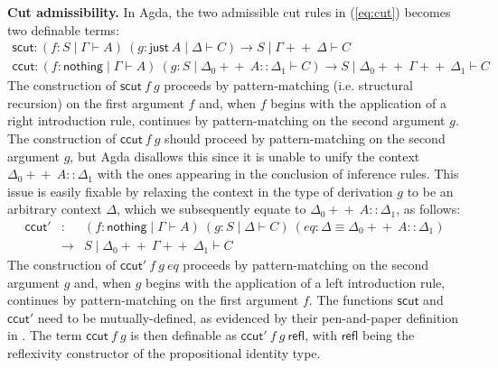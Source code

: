 \documentclass[sn-mathphys-num]{sn-jnl}%
\newcommand{\GG}{\Gamma}
\newcommand{\GD}{\Delta}
\newcommand{\vd}{\vdash}
\newcommand{\nothing}{\mathsf{nothing}}
\newcommand{\just}{\mathsf{just}}
\newcommand{\append}{+\!\!+}
\theoremstyle{thmstyleone}%
\theoremstyle{thmstyletwo}%
\theoremstyle{thmstylethree}%
\begin{document}
\noindent\textbf{Cut admissibility.}
In Agda, the two admissible cut rules in (\ref{eq:cut}) becomes two definable terms:
\[
\begin{array}{l}
  \mathsf{scut} : (f : S \mid \GG \vd A) ~(g : \just ~A \mid \GD \vd C) \to S \mid \GG \append ~\GD \vd C \\[2pt]
  \mathsf{ccut} : (f : \nothing \mid \GG \vd A) ~(g : S \mid \GD_0 \append ~A :: \GD_1 \vd C)
  \to S \mid \GD_0 \append ~\GG \append ~\GD_1 \vd C
\end{array}
\]
The construction of $\mathsf{scut} ~f ~g$ proceeds by pattern-matching (i.e. structural recursion) on the first argument $f$ and, when $f$ begins with the application of a right introduction rule, continues by pattern-matching on the second argument $g$.
The construction of $\mathsf{ccut} ~f ~g$ should proceed by pattern-matching on the second argument $g$, but Agda disallows this since it is unable to unify the context $\GD_0 \append ~A :: \GD_1$ with the ones appearing in the conclusion of inference rules. This issue is easily fixable by relaxing the context in the type of derivation $g$ to be an arbitrary context $\GD$, which we subsequently equate to $\GD_0 \append ~A :: \GD_1$, as follows:
\[
\begin{array}{rcl}
  \mathsf{ccut'} &:& (f : \nothing \mid \GG \vd A) ~(g : S \mid \GD \vd C) ~(eq : \GD \equiv \GD_0 \append ~A :: \GD_1) \\
  &\to& S \mid \GD_0 \append ~\GG \append ~\GD_1 \vd C
\end{array}
\]
The construction of $\mathsf{ccut'} ~f ~g ~eq$ proceeds by pattern-matching on the second argument $g$ and, when $g$ begins with the application of a left introduction rule, continues by pattern-matching on the first argument $f$.
The functions $\mathsf{scut}$ and $\mathsf{ccut'}$ need to be mutually-defined, as evidenced by their pen-and-paper definition in \cite{UVW:protsn,wan2024}.
The term $\mathsf{ccut} ~f ~g$ is then definable as $\mathsf{ccut'} ~f ~g ~\mathsf{refl}$, with $\mathsf{refl}$ being the reflexivity constructor of the propositional identity type.
\end{document}
